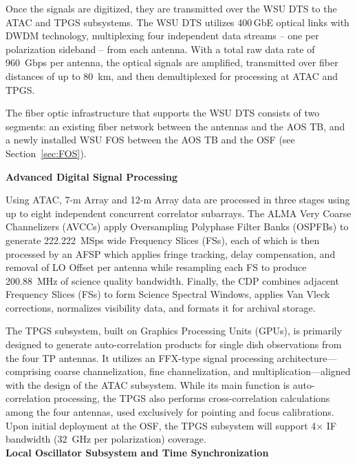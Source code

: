 Once the signals are digitized, they are transmitted over the \ac{WSU} \ac{DTS} to the \ac{ATAC} and \ac{TPGS} subsystems.
The \ac{WSU} \ac{DTS} utilizes 400\,GbE optical links with \ac{DWDM} technology, multiplexing four independent data streams -- one per polarization sideband -- from each antenna. 
With a total raw data rate of 960~Gbps per antenna, the optical signals are amplified, transmitted over fiber distances of up to 80~km, and then demultiplexed for processing at \ac{ATAC} and \ac{TPGS}.

The fiber optic infrastructure that supports the \ac{WSU} \ac{DTS} consists of two segments: an existing fiber network between the antennas and the \ac{AOS} \ac{TB}, and a newly installed \ac{WSU} \ac{FOS} between the \ac{AOS} \ac{TB} and the \ac{OSF} (see Section~\ref{sec:FOS}).


\noindent
\textbf{Advanced Digital Signal Processing}

Using \ac{ATAC}, 7-m Array and 12-m Array data are processed in three stages using up to eight independent concurrent correlator subarrays. The ALMA Very Coarse Channelizers (\acs{AVCC}s) apply Oversampling Polyphase Filter Banks (\acs{OSPFB}s) to generate 222.222~MSps wide Frequency Slices (\acs{FS}s), each of which is then processed by an \ac{AFSP} which applies fringe tracking, delay compensation, and removal of LO Offset per antenna while resampling each \acs{FS} to produce 200.88~MHz of science quality bandwidth.
Finally, the \ac{CDP} combines adjacent Frequency Slices (\acs{FS}s) to form Science Spectral Windows, applies Van Vleck corrections, normalizes visibility data, and formats it for archival storage.

The \ac{TPGS} subsystem, built on Graphics Processing Units (\acs{GPU}s), is primarily designed to generate auto-correlation products for single dish observations from the four \ac{TP} antennas.
It utilizes an FFX-type signal processing architecture—comprising coarse channelization, fine channelization, and multiplication—aligned with the design of the \ac{ATAC} subsystem.
While its main function is auto-correlation processing, the \ac{TPGS} also performs cross-correlation calculations among the four antennas, used exclusively for pointing and focus calibrations.
Upon initial deployment at the \ac{OSF}, the \ac{TPGS} subsystem will support 4$\times$ \ac{IF} bandwidth (32~GHz per polarization) coverage.\\


\noindent
\textbf{Local Oscillator Subsystem and Time Synchronization}


